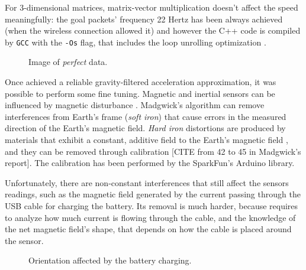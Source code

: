 For 3-dimensional matrices, matrix-vector multiplication doesn't affect the speed meaningfully: the goal packets' frequency 22 Hertz has been always achieved (when the wireless connection allowed it) and however the C++ code is compiled by \texttt{GCC} with the \texttt{-Os} flag, that includes the loop unrolling optimization \cite{UsingGCC}.
\bigbreak

\begin{center}
	\begin{figure}[ht!]
		\caption{Image of \textit{perfect} data.}
	\end{figure}
\end{center}

Once achieved a reliable gravity-filtered acceleration approximation, it was possible to perform some fine tuning. Magnetic and inertial sensors can be influenced by magnetic disturbance \cite{Fan17}. Madgwick's algorithm can remove interferences from Earth's frame (\textit{soft iron}) \cite[11-12]{Mad10} that cause errors in the measured direction of the Earth's magnetic field. \textit{Hard iron} distortions are produced by materials that exhibit a constant, additive field to the Earth's magnetic field \cite{CompensatingIron}, and they can be removed through calibration \cite{CompensatingIron, Geb06, Kok12} [CITE from 42 to 45 in Madgwick's report]. The calibration has been performed by the SparkFun's Arduino library.
\bigbreak

Unfortunately, there are non-constant interferences that still affect the sensors readings, such as the magnetic field generated by the current passing through the USB cable for charging the battery.
Its removal is much harder, because requires to analyze how much current is flowing through the cable, and the knowledge of the net magnetic field's shape, that depends on how the cable is placed around the sensor.
\bigbreak

\begin{center}
	\begin{figure}[ht!]
		\caption{Orientation affected by the battery charging.}
	\end{figure}
\end{center}

